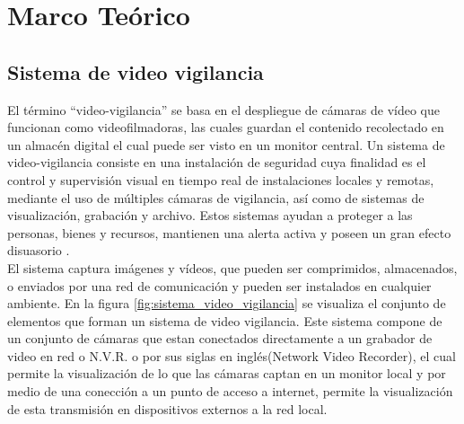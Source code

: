 \chapter{Marco Teórico}


\section{Sistema de video vigilancia}
El término ``video-vigilancia'' se basa en el despliegue de cámaras de vídeo que funcionan como videofilmadoras, las cuales guardan el contenido recolectado en un almacén digital el cual puede ser visto en un monitor central. Un sistema de video-vigilancia consiste en una instalación de seguridad cuya finalidad es el control y supervisión visual en tiempo real de instalaciones locales y remotas, mediante el uso de múltiples cámaras de vigilancia, así como de sistemas de visualización, grabación y archivo. Estos sistemas ayudan a proteger a las personas, bienes y recursos, mantienen una alerta activa y poseen un gran efecto disuasorio \cite{wikipedia:vvigilancia}.\\

El sistema captura imágenes y vídeos, que pueden ser comprimidos, almacenados, o enviados por una red de comunicación y pueden ser instalados en cualquier ambiente. En la figura \ref{fig:sistema_video_vigilancia} se visualiza el conjunto de elementos que forman un sistema de video vigilancia. Este sistema compone de un conjunto de cámaras que estan conectados directamente a un grabador de video en red o N.V.R. o por sus siglas en inglés(Network Video Recorder), el cual permite la visualización de lo que las cámaras captan en un monitor local y por medio de una conección a un punto de acceso a internet, permite la visualización de esta transmisión en dispositivos externos a la red local.\\

